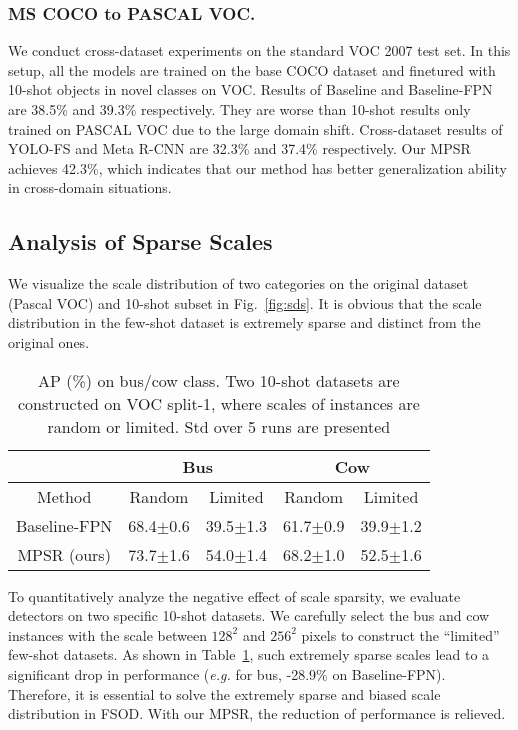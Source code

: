 \documentclass[runningheads]{llncs}
\begin{document}
\setlength{\tabcolsep}{1.4pt}

\subsubsection{MS COCO to PASCAL VOC.}
We conduct cross-dataset experiments on the standard VOC 2007 test set. 
In this setup, all the models are trained on the base COCO dataset and finetured with 10-shot objects in novel classes on VOC.
Results of Baseline and Baseline-FPN are 38.5\% and 39.3\% respectively. 
They are worse than 10-shot results only trained on PASCAL VOC due to the large domain shift. 
Cross-dataset results of YOLO-FS and Meta R-CNN are 32.3\% and 37.4\% respectively. 
Our MPSR achieves 42.3\%, which indicates that our method has better generalization ability in cross-domain situations.

\subsection{Analysis of Sparse Scales}
We visualize the scale distribution of two categories on the original dataset (Pascal VOC) and 10-shot subset in Fig.~\ref{fig:sds}.
It is obvious that the scale distribution in the few-shot dataset is extremely sparse and distinct from the original ones.

\setlength{\tabcolsep}{4pt}
\begin{table}
	\begin{center}
		\caption{AP (\%) on bus/cow class. Two 10-shot datasets are constructed on VOC split-1, where scales of instances are random or limited. Std over 5 runs are presented}
		\label{table:extremetable}
		\begin{tabular}{c|cc|cc}
			\hline
			& \multicolumn{2}{c|}{Bus} & \multicolumn{2}{c}{Cow} \\ \hline
			Method       & Random     & Limited     & Random      & Limited     \\ \hline
			Baseline-FPN & 68.4$\pm$0.6       & 39.5$\pm$1.3        & 61.7$\pm$0.9        & 39.9$\pm$1.2         \\
			MPSR (ours)  & 73.7$\pm$1.6       & 54.0$\pm$1.4          & 68.2$\pm$1.0        & 52.5$\pm$1.6        \\ \hline
		\end{tabular}
	\end{center}
\end{table}
\setlength{\tabcolsep}{1.4pt}

To quantitatively analyze the negative effect of scale sparsity, we evaluate detectors on two specific 10-shot datasets. 
We carefully select the bus and cow instances with the scale between $128^2$ and $256^2$ pixels to construct the ``limited'' few-shot datasets. 
As shown in Table~\ref{table:extremetable}, such extremely sparse scales lead to a significant drop in performance (\emph{e.g.} for bus, -28.9\% on Baseline-FPN). 
Therefore, it is essential to solve the extremely sparse and biased scale distribution in FSOD.
With our MPSR, the reduction of performance is relieved.
\end{document}
